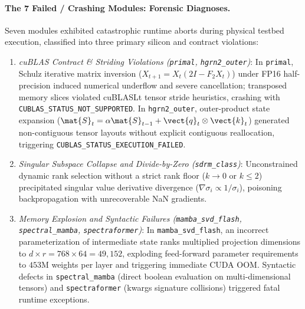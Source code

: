\paragraph{The 7 Failed / Crashing Modules: Forensic Diagnoses.}
Seven modules exhibited catastrophic runtime aborts during physical testbed execution, classified into three primary silicon and contract violations:
\begin{enumerate}
    \item \emph{cuBLAS Contract \& Striding Violations (\texttt{primal}, \texttt{hgrn2\_outer})}: In \texttt{primal}, Schulz iterative matrix inversion ($X_{t+1} = X_t(2I - F_2 X_t)$) under FP16 half-precision induced numerical underflow and severe cancellation; transposed memory slices violated cuBLASLt tensor stride heuristics, crashing with \texttt{CUBLAS\_STATUS\_NOT\_SUPPORTED}. In \texttt{hgrn2\_outer}, outer-product state expansion ($\mat{S}_t = \alpha \mat{S}_{t-1} + \vect{q}_t \otimes \vect{k}_t$) generated non-contiguous tensor layouts without explicit contiguous reallocation, triggering \texttt{CUBLAS\_STATUS\_EXECUTION\_FAILED}.
    \item \emph{Singular Subspace Collapse and Divide-by-Zero (\texttt{sdrm\_class})}: Unconstrained dynamic rank selection without a strict rank floor ($k \to 0$ or $k \le 2$) precipitated singular value derivative divergence ($\nabla \sigma_i \propto 1/\sigma_i$), poisoning backpropagation with unrecoverable NaN gradients.
    \item \emph{Memory Explosion and Syntactic Failures (\texttt{mamba\_svd\_flash}, \texttt{spectral\_mamba}, \texttt{spectraformer})}: In \texttt{mamba\_svd\_flash}, an incorrect parameterization of intermediate state ranks multiplied projection dimensions to $d \times r = 768 \times 64 = 49{,}152$, exploding feed-forward parameter requirements to $453\text{M}$ weights per layer and triggering immediate CUDA OOM. Syntactic defects in \texttt{spectral\_mamba} (direct boolean evaluation on multi-dimensional tensors) and \texttt{spectraformer} (kwargs signature collisions) triggered fatal runtime exceptions.
\end{enumerate}

